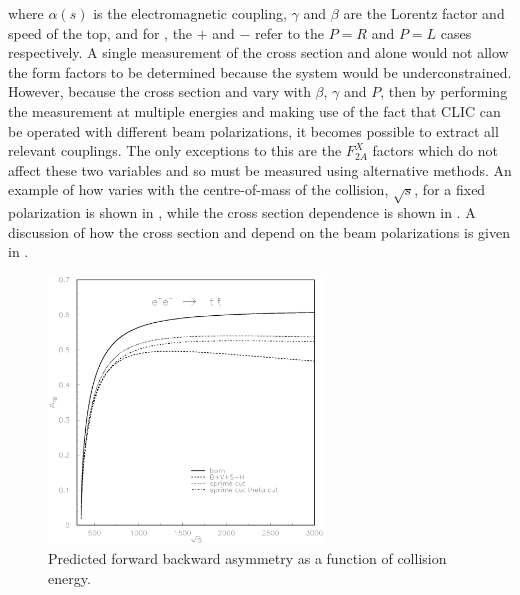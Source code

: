 where $\alpha(s)$  is the electromagnetic coupling, $\gamma$ and $\beta$ are the Lorentz factor and speed of the top, and for , the $+$ and $-$ refer to the $P=R$ and $P=L$ cases respectively. A single measurement of the cross section and \afb alone would not allow the form factors to be determined because the system would be underconstrained. However, because the cross section and \afb vary with $\beta$, $\gamma$ and $P$, then by performing the measurement at multiple energies and making use of the fact that \ac{CLIC} can be operated with different beam polarizations, it becomes possible to extract all relevant couplings. The only exceptions to this are the $F_{2A}^X$ factors which do not affect these two variables and so must be measured using alternative methods. An example of how \afb varies with the centre-of-mass of the collision, $\sqrt{s}$, for a fixed polarization is shown in , while the cross section dependence is shown in . A discussion of how the cross section and \afb depend on the beam polarizations is given in \cite{AguilarSaavedra:2012vh}.  

\begin{figure}
  \centering
  \includegraphics[width=0.65\textwidth]{TopAnalysis/figures/asym-top.eps}
  \caption[Predicted forward backward asymmetry as a function of collision energy]{Predicted forward backward asymmetry as a function of collision energy\cite{Fleischer:2003kk}.}
  \label{fig:AfbSDependence}
\end{figure}

